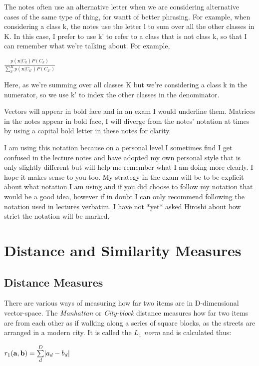 \documentclass[10pt,a4paper]{article}
\begin{document}
	The notes often use an alternative letter when we are considering alternative cases of the same type of thing, for wantt of better phrasing. For example, when considering a class k, the notes use the letter l to sum over all the other classes in K. In this case, I prefer to use k' to refer to a class that is not class k, so that I can remember what we're talking about. For example, 
	
	\begin{center}
		
		$		\frac{p(\mathbf{x}|C_k)P(C_k)}{\sum\limits_{k'}^Kp(\mathbf{x}|C_{k'})P(C_{k'})}
		$
	\end{center}
	
	Here, as we're summing over all classes K but we're considering a class k in the numerator, so we use k' to index the other classes in the denominator.
	
	Vectors will appear in bold face and in an exam I would underline them. Matrices in the notes appear in bold face, I will diverge from the notes' notation at times by using a capital bold letter in these notes for clarity.
	
	I am using this notation because on a personal level I sometimes find I get confused in the lecture notes and have adopted my own personal style that is only slightly different but will help me remember what I am doing more clearly. I hope it makes sense to you too. My strategy in the exam will be to be explicit about what notation I am using and if you did choose to follow my notation that would be a good idea, however if in doubt I can only recommend following the notation used in lectures verbatim. I have not *yet* asked Hiroshi about how strict the notation will be marked.
	
	

	
	
	
	\section{Distance and Similarity Measures}

		\subsection{Distance Measures}
		There are various ways of measuring how far two items are in D-dimensional vector-space. The \textit{Manhattan} or \textit{City-block} distance measures how far two items are from each other as if walking along a series of square blocks, as the streets are arranged in a modern city. It is called the \textit{$L_{1}$ norm} and is calculated thus:
			\begin{center}
			$
			r_{1}(\textbf{a}, \textbf{b}) = \sum\limits_d^D\abs{a_d - b_d} 
			$
			
			\end{center}
			
\end{document}
